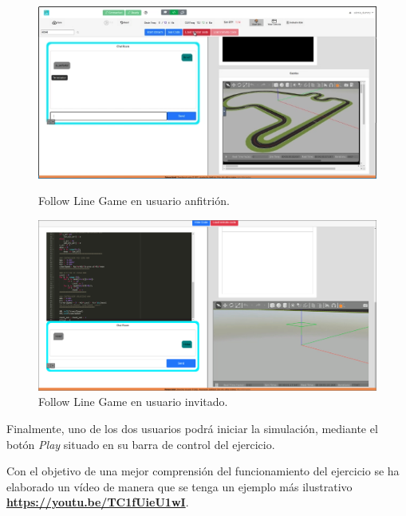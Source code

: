 \documentclass[a4paper, 12pt]{book}
\begin{document}
\begin{figure}[H]
  \centering
  \begin{minipage}[b]{0.9\textwidth}
    \includegraphics[width=\textwidth]{img/host_gazebo.png}
    \caption{Follow Line Game en usuario anfitrión.}
    \label{figura:robot_davinci}
  \end{minipage}
  \hfill
  \begin{minipage}[b]{0.9\textwidth}
    \includegraphics[width=\textwidth]{img/inv_gazebo.png}
    \caption{Follow Line Game en usuario invitado.}
    \label{figura:robot_atrias}
  \end{minipage}
\end{figure}

Finalmente, uno de los dos usuarios podrá iniciar la simulación, mediante el botón \emph{Play} situado en su barra de control del ejercicio.

Con el objetivo de una mejor comprensión del funcionamiento del ejercicio se ha elaborado un vídeo de manera que se tenga un ejemplo más ilustrativo \textbf{\url{https://youtu.be/TC1fUieU1wI}}.




\end{document}
